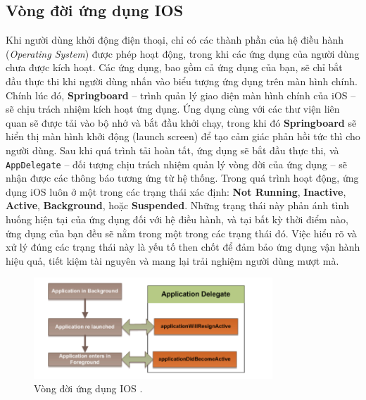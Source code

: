        
        \vspace{0.5em}
   \subsection{ Vòng đời ứng dụng IOS}	
        
            \hspace*{0.8cm}Khi người dùng khởi động điện thoại, chỉ có các thành phần của hệ điều hành (\textit{Operating System}) được phép hoạt động, trong khi các ứng dụng của người dùng chưa được kích hoạt. Các ứng dụng, bao gồm cả ứng dụng của bạn, sẽ chỉ bắt đầu thực thi khi người dùng nhấn vào biểu tượng ứng dụng trên màn hình chính. Chính lúc đó, \textbf{Springboard} – trình quản lý giao diện màn hình chính của iOS – sẽ chịu trách nhiệm kích hoạt ứng dụng. Ứng dụng cùng với các thư viện liên quan sẽ được tải vào bộ nhớ và bắt đầu khởi chạy, trong khi đó \textbf{Springboard} sẽ hiển thị màn hình khởi động (launch screen) để tạo cảm giác phản hồi tức thì cho người dùng. Sau khi quá trình tải hoàn tất, ứng dụng sẽ bắt đầu thực thi, và \texttt{AppDelegate} – đối tượng chịu trách nhiệm quản lý vòng đời của ứng dụng 
            – sẽ nhận được các thông báo tương ứng từ hệ thống.
            Trong quá trình hoạt động, ứng dụng iOS luôn ở một trong các trạng thái xác định: \textbf{Not Running}, \textbf{Inactive}, \textbf{Active}, \textbf{Background}, hoặc \textbf{Suspended}. Những trạng thái này phản ánh tình huống hiện tại của ứng dụng đối với hệ điều hành, và tại bất kỳ thời điểm nào, ứng dụng của bạn đều sẽ nằm trong một trong các trạng thái đó. Việc hiểu rõ và xử lý đúng các trạng thái này là yếu tố then chốt để đảm bảo ứng dụng vận hành hiệu quả, tiết kiệm tài nguyên và mang lại trải nghiệm người dùng mượt mà.
            
        \vspace{0.5em}
        \begin{figure}[H] %
            \centering
            \includegraphics[width=0.8\textwidth]{images/vongdoiios.png}
             \caption{Vòng đời ứng dụng IOS \cite{life cycle-IOS}.} 
            \label{fig:vongdoiios}
        \end{figure}
         
